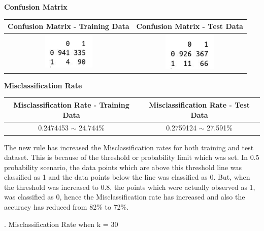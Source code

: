 \documentclass[a4paper,10pt]{article}
\begin{document}
\begin{center}
	\textbf{Confusion Matrix} \par
	\begin{tabular}{|c|c|}
		\hline
		Confusion Matrix - Training Data&
		Confusion Matrix - Test Data\\
		\hline
		\cellcolor{yellow!100} \includegraphics[width=25mm,scale=0.10]{Confusion_Matrix_training_Data_2.png} &
		\cellcolor{yellow!100} \includegraphics[width=25mm,scale=0.10]{Confusion_Matrix_test_Data_2.png}\\
		\hline
	\end{tabular}\par \par
	\textbf{Misclassification Rate} \par
	\begin{tabular}{|c|c|}
		\hline
		Misclassification Rate - Training Data&
		Misclassification Rate - Test Data\\
		\hline
		\cellcolor{yellow!100} 0.2474453 $\sim$ 24.744\% & \cellcolor{yellow!100} 0.2759124 $\sim$ 27.591\%\\
		\hline
	\end{tabular}\par
\end{center} 
The new rule has increased the Misclassification rates for both training and test dataset. This is because of the 
threshold or probability limit which was set. In 0.5 probability scenario, the data points which are above this 
threshold line was classified as 1 and the data points below the line was classified as 0. But, when the threshold
was increased to 0.8, the points which were actually observed as 1, was classified as 0, hence the Misclassification
rate has increased and also the accuracy has reduced from 82\% to 72\%.\par
\vspace{0.5cm}
. Misclassification Rate when k = 30 \par
\end{document}
